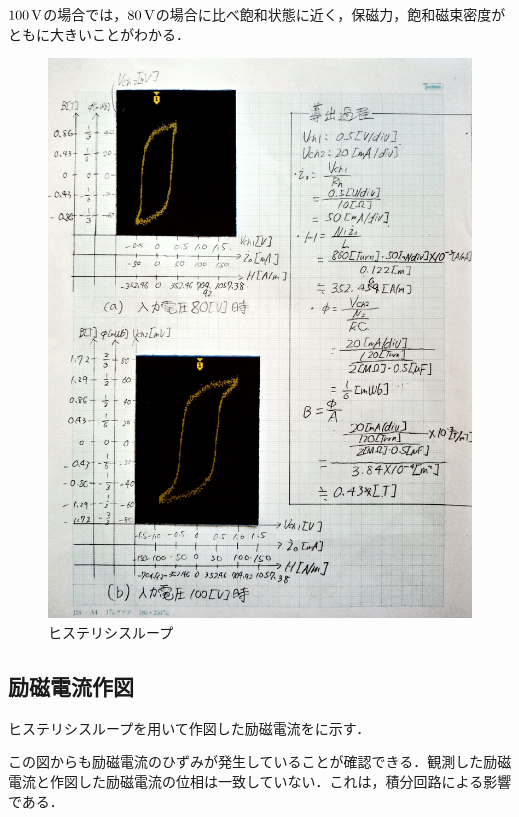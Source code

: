 $100\,\rm{V}$の場合では，$80\,\rm{V}$の場合に比べ飽和状態に近く，保磁力，飽和磁束密度がともに大きいことがわかる．
\begin{figure}[h]
	\centering
	\includegraphics[scale=0.8]{./data/graph/2.pdf}
	\caption{ヒステリシスループ}
	\label{fig:2}
\end{figure}

\subsection{励磁電流作図}
ヒステリシスループを用いて作図した励磁電流をに示す．

この図からも励磁電流のひずみが発生していることが確認できる．観測した励磁電流と作図した励磁電流の位相は一致していない．これは，積分回路による影響である．

